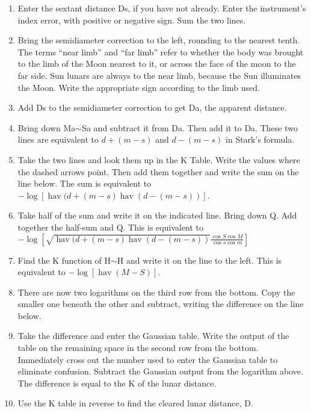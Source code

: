 \documentclass[letterpaper]{article}
\DeclareMathOperator{\hav}{hav}
\numberwithin{equation}{section}
\begin{document}
\begin{enumerate}
		\item Enter the sextant distance Ds, if you have not already. Enter the instrument's index error, with positive or negative sign. Sum the two lines.
		\item Bring the semidiameter correction to the left, rounding to the nearest tenth. The terms ``near limb'' and ``far limb'' refer to whether the body was brought to the limb of the Moon nearest to it, or across the face of the moon to the far side. Sun lunars are always to the near limb, because the Sun illuminates the Moon. Write the appropriate sign according to the limb used.
		\item Add Ds to the semidiameter correction to get Da, the apparent distance.
		\item Bring down Ma$\sim$Sa and subtract it from Da. Then add it to Da. These two lines are equivalent to $d+(m-s)$ and $d-(m-s)$ in Stark's formula.
		\item Take the two lines and look them up in the K Table. Write the values where the dashed arrows point. Then add them together and write the sum on the line below. The sum is equivalent to $-\log[\hav(d+(m-s) \hav(d-(m-s))]$.
		\item Take half of the sum and write it on the indicated line. Bring down Q. Add together the half-sum and Q. This is equivalent to $-\log[\sqrt{\hav(d+(m-s) \hav(d-(m-s))}\frac{\cos S \cos M}{\cos s \cos m}]$
		\item Find the K function of H$\sim$H and write it on the line to the left. This is equivalent to $-\log[\hav(M-S)]$.
		\item There are now two logarithms on the third row from the bottom. Copy the smaller one beneath the other and subtract, writing the difference on the line below.
		\item Take the difference and enter the Gaussian table. Write the output of the table on the remaining space in the second row from the bottom. Immediately cross out the number used to enter the Gaussian table to eliminate confusion. Subtract the Gaussian output from the logarithm above. The difference is equal to the K of the lunar distance. 
		\item Use the K table in reverse to find the cleared lunar distance, D.
	\end{enumerate}
\end{document}
